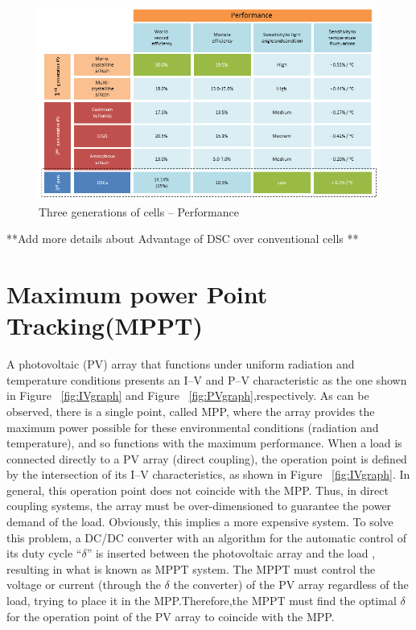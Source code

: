    
  \begin{figure}[H]
  \begin{center}
  \includegraphics[width=\textwidth]{images/3rd_gen}
  \caption{ Three generations of cells –  Performance}
  \label{fig:3rd_gen}
  \end{center}
  \end{figure}
 
  **Add more details about Advantage of DSC over conventional cells **\\
 
   
\section{Maximum power Point Tracking(MPPT)}

A photovoltaic (PV) array that functions under uniform radiation and temperature conditions presents an I–V and P–V characteristic as the one shown in Figure ~\ref{fig:IVgraph} and Figure ~\ref{fig:PVgraph},respectively. As can be observed, there is a single point, called \ac{MPP}, where the array provides the maximum power possible for these environmental conditions (radiation and temperature), and so functions with the maximum performance. When a load is connected directly to a PV array (direct coupling), the operation point is defined by the intersection of its I–V characteristics, as shown in Figure ~\ref{fig:IVgraph}. In general, this operation point does not coincide with the \ac{MPP}. Thus, in direct coupling systems, the array must be over-dimensioned to guarantee the power demand of the load. Obviously, this implies a more expensive system. To solve this problem, a DC/DC  converter with an algorithm for the automatic control of its duty cycle “${\delta}$” is inserted between the photovoltaic array and the load , resulting in what is known as \ac{MPPT} system. The MPPT must control the voltage or current (through the ${\delta}$ the converter) of the PV array regardless of the load, trying to place it in the \ac{MPP}.Therefore,the MPPT must find the optimal ${\delta}$ for the operation point of the PV array to coincide with the \ac{MPP}\cite{enrique2010reliable}.\\

